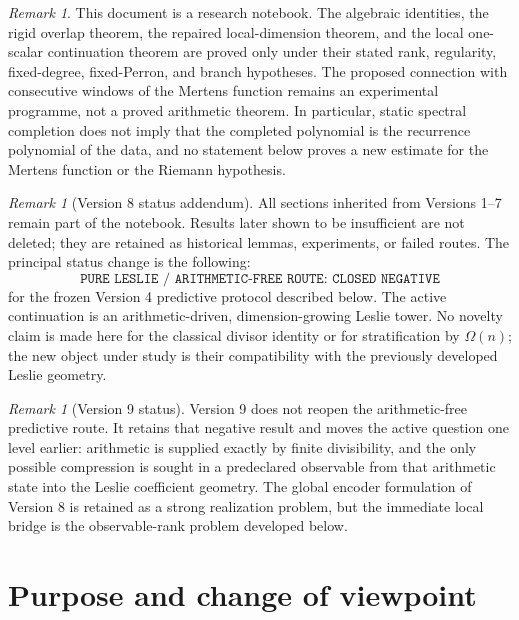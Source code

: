 \documentclass[11pt]{amsart}
\numberwithin{equation}{section}
\theoremstyle{plain}
\theoremstyle{definition}
\theoremstyle{remark}
\newtheorem{remark}[theorem]{Remark}
\begin{document}
\begin{remark}
\label{rem:status}
This document is a research notebook.  The algebraic identities, the rigid overlap theorem,
the repaired local-dimension theorem, and the local one-scalar continuation theorem are proved
only under their stated rank, regularity, fixed-degree, fixed-Perron, and branch hypotheses.
The proposed connection with consecutive windows of the Mertens function remains an experimental
programme, not a proved arithmetic theorem.  In particular, static spectral completion does not
imply that the completed polynomial is the recurrence polynomial of the data, and no statement
below proves a new estimate for the Mertens function or the Riemann hypothesis.
\end{remark}

\begin{remark}[Version 8 status addendum]
\label{rem:v8_status_addendum}
All sections inherited from Versions 1--7 remain part of the notebook.  Results later shown to be
insufficient are not deleted; they are retained as historical lemmas, experiments, or failed
routes.  The principal status change is the following:
\[
\boxed{\texttt{PURE LESLIE / ARITHMETIC-FREE ROUTE: CLOSED NEGATIVE}}
\]
for the frozen Version 4 predictive protocol described below.  The active continuation is an
arithmetic-driven, dimension-growing Leslie tower.  No novelty claim is made here for the
classical divisor identity or for stratification by $\Omega(n)$; the new object under study is
their compatibility with the previously developed Leslie geometry.
\end{remark}

\begin{remark}[Version 9 status]
\label{rem:v9_status}
Version 9 does not reopen the arithmetic-free predictive route.  It retains that negative result
and moves the active question one level earlier: arithmetic is supplied exactly by finite
divisibility, and the only possible compression is sought in a predeclared observable from that
arithmetic state into the Leslie coefficient geometry.  The global encoder formulation of
Version 8 is retained as a strong realization problem, but the immediate local bridge is the
observable-rank problem developed below.
\end{remark}

\section{Purpose and change of viewpoint}
\label{sec:purpose}
\end{document}
